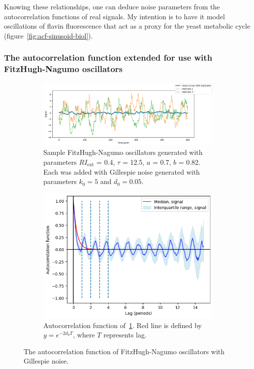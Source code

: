 Knowing these relationships, one can deduce noise parameters from the autocorrelation functions of real signals.
My intention is to have it model oscillations of flavin fluorescence that act as a proxy for the yeast metabolic cycle (figure~\ref{fig:acf-sinusoid-biol}).


\subsubsection{The autocorrelation function extended for use with FitzHugh-Nagumo oscillators}
\label{subsubsec:analysis-characterisation-acf-fhn}

\begin{figure}
  \centering
  \begin{subfigure}[t]{0.7\textwidth}
  \centering
    \includegraphics[width=\linewidth]{fhn_meanplot}
    \caption{
      Sample FitzHugh-Nagumo oscillators generated with parameters $RI_{\mathrm{ext}}$ = 0.4, $\tau$ = 12.5, $a$ = 0.7, $b$ = 0.82.
      Each was added with Gillespie noise generated with parameters $k_{0} = 5$ and $d_{0} = 0.05$.
    }
    \label{fig:acf-fhn-gillnoise-ts}
  \end{subfigure}

  \begin{subfigure}[t]{0.7\textwidth}
  \centering
    \includegraphics[width=\linewidth]{fhn_acf}
    \caption{
      Autocorrelation function of~\ref{fig:acf-fhn-gillnoise-ts}.
      Red line is defined by $y = e^{-2d_{0}T}$, where $T$ represents lag.
    }
    \label{fig:acf-fhn-gillnoise-acf}
  \end{subfigure}

  \caption{
    The autocorrelation function of FitzHugh-Nagumo oscillators with Gillespie noise.
  }
  \label{fig:acf-fhn}
\end{figure}

